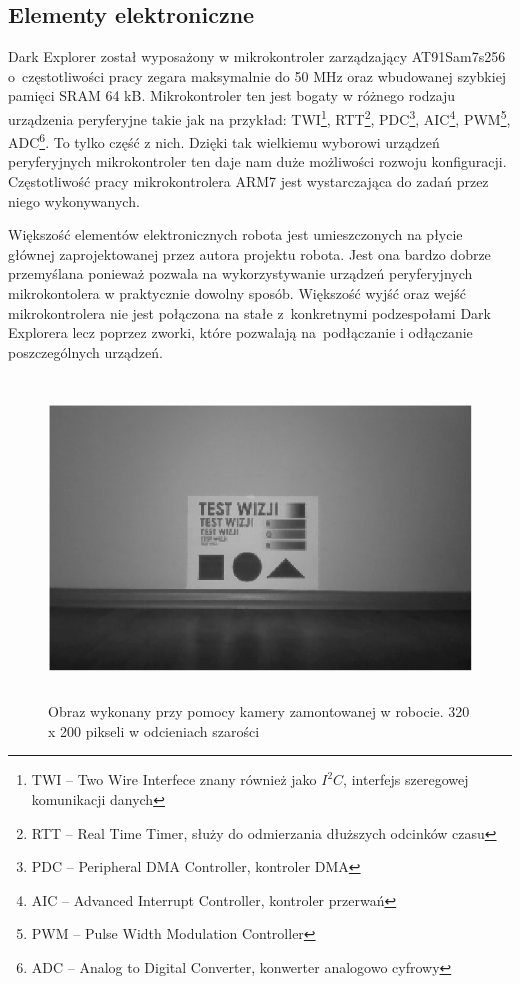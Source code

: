 \subsection{Elementy elektroniczne}
Dark Explorer został wyposażony w mikrokontroler zarządzający AT91Sam7s256 o~częstotliwości pracy zegara maksymalnie do 50 MHz oraz wbudowanej szybkiej
pamięci SRAM 64 kB. Mikrokontroler ten jest bogaty w różnego rodzaju urządzenia
peryferyjne takie jak na przykład: TWI\footnote{TWI -- Two Wire Interfece znany
również jako $I^{2}C$, interfejs szeregowej komunikacji danych}, RTT\footnote{RTT
-- Real Time Timer, służy do odmierzania dłuższych odcinków czasu},
PDC\footnote{PDC -- Peripheral DMA Controller, kontroler DMA}, AIC\footnote{AIC
-- Advanced Interrupt Controller, kontroler przerwań}, PWM\footnote{PWM -- Pulse
Width Modulation Controller}, ADC\footnote{ADC -- Analog to Digital Converter,
konwerter analogowo cyfrowy}. To tylko część z nich. Dzięki tak wielkiemu
wyborowi urządzeń peryferyjnych mikrokontroler ten daje nam duże możliwości
rozwoju konfiguracji. Częstotliwość pracy mikrokontrolera ARM7 jest wystarczająca
do zadań przez niego wykonywanych.

Większość elementów elektronicznych robota jest umieszczonych na płycie głównej
zaprojektowanej przez autora projektu robota. Jest ona bardzo dobrze przemyślana
ponieważ pozwala na wykorzystywanie urządzeń peryferyjnych mikrokontolera w
praktycznie dowolny sposób. Większość wyjść oraz wejść mikrokontrolera nie jest
połączona na stałe z~konkretnymi podzespołami Dark Explorera lecz poprzez zworki,
które pozwalają na~podłączanie i odłączanie poszczególnych urządzeń.

\begin{figure}[!h]
 \centering
 \includegraphics[height=85mm]{../images/ch02/320x200B&W.jpg}
 \caption{Obraz wykonany przy pomocy kamery zamontowanej w robocie. 320 x 200 pikseli w odcieniach szarości \cite{KmakMScThesis2009}}
 \label{fig:320x200BW}
\end{figure}

